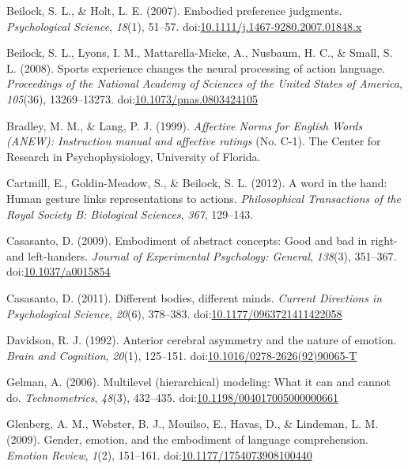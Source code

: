 \documentclass[english,man]{apa6}
\theoremstyle{definition}
\theoremstyle{definition}
\theoremstyle{definition}
\theoremstyle{remark}
\begin{document}
\hypertarget{ref-Beilock2007}{}
Beilock, S. L., \& Holt, L. E. (2007). Embodied preference judgments.
\emph{Psychological Science}, \emph{18}(1), 51--57.
doi:\href{https://doi.org/10.1111/j.1467-9280.2007.01848.x}{10.1111/j.1467-9280.2007.01848.x}

\hypertarget{ref-Beilock2008}{}
Beilock, S. L., Lyons, I. M., Mattarella-Micke, A., Nusbaum, H. C., \&
Small, S. L. (2008). Sports experience changes the neural processing of
action language. \emph{Proceedings of the National Academy of Sciences
of the United States of America}, \emph{105}(36), 13269--13273.
doi:\href{https://doi.org/10.1073/pnas.0803424105}{10.1073/pnas.0803424105}

\hypertarget{ref-Bradley1999}{}
Bradley, M. M., \& Lang, P. J. (1999). \emph{Affective Norms for English
Words (ANEW): Instruction manual and affective ratings} (No. C-1). The
Center for Research in Psychophysiology, University of Florida.

\hypertarget{ref-Cartmill2012}{}
Cartmill, E., Goldin-Meadow, S., \& Beilock, S. L. (2012). A word in the
hand: Human gesture links representations to actions.
\emph{Philosophical Transactions of the Royal Society B: Biological
Sciences}, \emph{367}, 129--143.

\hypertarget{ref-Casasanto2009}{}
Casasanto, D. (2009). Embodiment of abstract concepts: Good and bad in
right- and left-handers. \emph{Journal of Experimental Psychology:
General}, \emph{138}(3), 351--367.
doi:\href{https://doi.org/10.1037/a0015854}{10.1037/a0015854}

\hypertarget{ref-Casasanto2011}{}
Casasanto, D. (2011). Different bodies, different minds. \emph{Current
Directions in Psychological Science}, \emph{20}(6), 378--383.
doi:\href{https://doi.org/10.1177/0963721411422058}{10.1177/0963721411422058}

\hypertarget{ref-Davidson1992}{}
Davidson, R. J. (1992). Anterior cerebral asymmetry and the nature of
emotion. \emph{Brain and Cognition}, \emph{20}(1), 125--151.
doi:\href{https://doi.org/10.1016/0278-2626(92)90065-T}{10.1016/0278-2626(92)90065-T}

\hypertarget{ref-Gelman2006}{}
Gelman, A. (2006). Multilevel (hierarchical) modeling: What it can and
cannot do. \emph{Technometrics}, \emph{48}(3), 432--435.
doi:\href{https://doi.org/10.1198/004017005000000661}{10.1198/004017005000000661}

\hypertarget{ref-Glenberg2009}{}
Glenberg, A. M., Webster, B. J., Mouilso, E., Havas, D., \& Lindeman, L.
M. (2009). Gender, emotion, and the embodiment of language
comprehension. \emph{Emotion Review}, \emph{1}(2), 151--161.
doi:\href{https://doi.org/10.1177/1754073908100440}{10.1177/1754073908100440}
\end{document}
